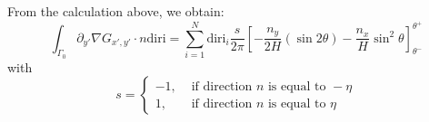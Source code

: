 \documentclass[a4paper,12pt]{article}
\newcommand{\integ}[3]{%
\ensuremath{\displaystyle{\int^{#2}_{#1} #3}}}
\begin{document}
\begin{enumerate}
From the calculation above, we obtain:
\begin{equation}
 \integ{\Gamma_0}{}{\partial_{y'}\nabla G_{x',y'} \cdot n \text{diri}}=\sum\limits_{i=1}^N \text{diri}_i\frac{s}{2\pi} \left[-\frac{n_y}{2H}\left(\sin2\theta\right)-\frac{n_x}{H}\sin^2\theta \right]_{\theta^-}^{\theta^+}
\end{equation}
with
 \[
 s=\left\{ \begin{array}{ll}
    -1, & \text{ if direction } n \text{ is equal to }-\eta\\
    1, & \text{ if direction } n \text{ is equal to } \eta
   \end{array}\right.
\]

\end{enumerate}
\end{document}
